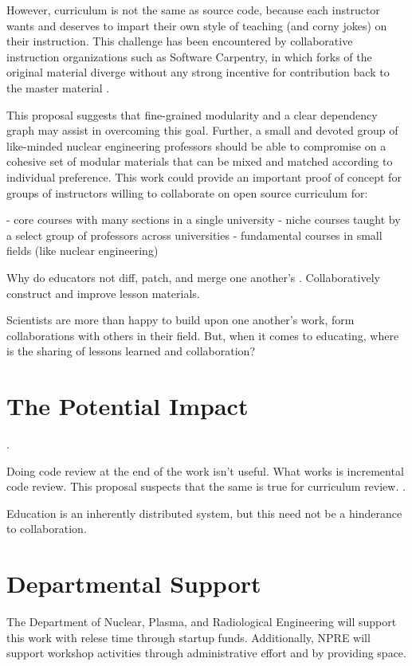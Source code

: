 \documentclass[11pt]{article}
\begin{document}
          However, curriculum is not the same as source code, because each 
          instructor wants and deserves to impart their own style of teaching 
          (and corny jokes) on their instruction. This challenge has been 
          encountered by collaborative instruction organizations such as 
          Software Carpentry, in which forks of the original material diverge 
          without any strong incentive for contribution back to the master 
          material \cite{wilson_software_2014}.

          This proposal suggests that fine-grained modularity and a clear 
          dependency graph may assist in overcoming this goal. Further, a small 
          and devoted group of like-minded nuclear engineering professors 
          should be able to compromise on a cohesive set of modular materials 
          that can be mixed and matched according to individual preference. 
          This work could provide an important proof of concept for groups of 
          instructors willing to collaborate on open source curriculum for:

          - core courses with many sections in a single university
          - niche courses taught by a select group of professors across 
          universities
          - fundamental courses in small fields (like nuclear engineering)

          Why do educators not diff, patch, and merge one another's . 
          Collaboratively construct and improve lesson materials. 
         
          Scientists are more than happy to build upon one another's work, form 
          collaborations with others in their field. But, 
          when it comes to educating, where is the sharing of lessons learned 
          and collaboration? 

          \section{The Potential Impact}
          \cite{wilson_software_2014}.

          Doing code review at the end of the work isn't useful. What works is 
          incremental code review. This proposal suspects that the same is true 
          for curriculum review. 
          \cite{wilson_software_2014}.

          Education is an inherently distributed system, but this need not be a 
          hinderance to collaboration.

          
          

          \section{Departmental Support}
          The Department of Nuclear, Plasma, and Radiological Engineering will 
          support this work with relese time through startup funds. 
          Additionally, NPRE will support workshop activities through 
          administrative effort and by providing space.
          
\end{document}
